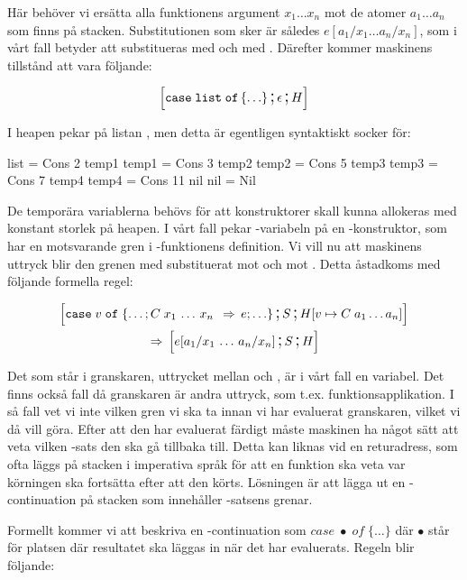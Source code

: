 \documentclass[../Core]{subfiles}
\begin{document}
Här behöver vi ersätta alla funktionens argument $x_{1}\ldots x_{n}$ mot
de atomer $a_{1}\ldots a_{n}$ som finns på stacken. Substitutionen som sker är 
således $e[a{}_{1}/x_{1}\ldots a_{n}/x_{n}]$, som i vårt fall betyder att
 substitueras med  och  med . Därefter kommer maskinens tillstånd att vara följande:

\[
\text{\large$$}\Big[\mathtt{case\; list\; of\,\lbrace\ldots\rbrace} \,\text{\Large;}\, \epsilon \,\text{\Large;}\, H\Big]
\]


I heapen pekar  på listan \ic{[2,3,5,7,11]}, men detta är egentligen syntaktiskt socker
för:

\begin{codeEx}
list = Cons 2 temp1
temp1 = Cons 3 temp2
temp2 = Cons 5 temp3
temp3 = Cons 7 temp4
temp4 = Cons 11 nil
nil = Nil
\end{codeEx}

De temporära variablerna behövs för att konstruktorer skall kunna
allokeras med konstant storlek på heapen. I vårt fall pekar
-variabeln på en -konstruktor, som har en motsvarande gren
i -funktionens definition. Vi vill nu att maskinens uttryck
blir den grenen med  substituerat mot  och  mot .
Detta åstadkoms med följande formella regel:

\begin{multline*}
\text{\large$$}\Big[\mathtt{case}\; v\; \mathtt{of}\;\{\ldots;C\; x_{1}\,\ldots\, x_{n}\;\,\Rightarrow\, e;\ldots\} \,\text{\Large;}\, S \,\text{\Large;}\, H[v\mapsto C\; a_{1}\ldots a_{n}]\Big]\\
\,\Rightarrow\, \text{\large$$}\Big[e[a_{1}/x_{1}\,\ldots\, a_{n}/x_{n}] \,\text{\Large;}\, S \,\text{\Large;}\, H\Big]
\end{multline*}


Det som står i granskaren, uttrycket mellan  och , är i vårt
fall en variabel. Det finns också fall då granskaren är andra uttryck, som
t.ex. funktionsapplikation. I så fall vet vi inte vilken gren vi ska
ta innan vi har evaluerat granskaren, vilket vi då vill göra.
Efter att den har evaluerat färdigt måste maskinen ha något sätt att
veta vilken -sats den ska gå tillbaka till. Detta kan liknas
vid en returadress, som ofta läggs på stacken i imperativa språk för att
en funktion ska veta var körningen ska fortsätta efter att den körts.
Lösningen är att lägga ut en -continuation på stacken
som innehåller -satsens grenar.

Formellt kommer vi att beskriva en -continuation som $case\;\bullet\; of\;\{\ldots\}$
där $\bullet$ står för platsen där resultatet ska läggas in när det har evaluerats. Regeln
blir följande:
\end{document}
